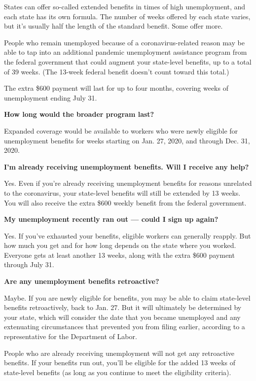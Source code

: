 States can offer so-called extended benefits in times of high
unemployment, and each state has its own formula. The number of weeks
offered by each state varies, but it's usually half the length of the
standard benefit. Some offer more.

People who remain unemployed because of a coronavirus-related reason may
be able to tap into an additional pandemic unemployment assistance
program from the federal government that could augment your state-level
benefits, up to a total of 39 weeks. (The 13-week federal benefit
doesn't count toward this total.)

The extra \$600 payment will last for up to four months, covering weeks
of unemployment ending July 31.

\textbf{How long would the broader program last?}

Expanded coverage would be available to workers who were newly eligible
for unemployment benefits for weeks starting on Jan. 27, 2020, and
through Dec. 31, 2020.

\textbf{I'm already receiving unemployment benefits. Will I receive any
help?}

Yes. Even if you're already receiving unemployment benefits for reasons
unrelated to the coronavirus, your state-level benefits will still be
extended by 13 weeks. You will also receive the extra \$600 weekly
benefit from the federal government.

\textbf{My unemployment recently ran out --- could I sign up again?}

Yes. If you've exhausted your benefits, eligible workers can generally
reapply. But how much you get and for how long depends on the state
where you worked. Everyone gets at least another 13 weeks, along with
the extra \$600 payment through July 31.

\textbf{Are any unemployment benefits retroactive?}

Maybe. If you are newly eligible for benefits, you may be able to claim
state-level benefits retroactively, back to Jan. 27. But it will
ultimately be determined by your state, which will consider the date
that you became unemployed and any extenuating circumstances that
prevented you from filing earlier, according to a representative for the
Department of Labor.

People who are already receiving unemployment will not get any
retroactive benefits. If your benefits run out, you'll be eligible for
the added 13 weeks of state-level benefits (as long as you continue to
meet the eligibility criteria).

